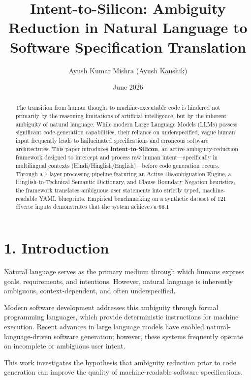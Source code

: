 \documentclass[11pt,a4paper]{article}
\title{Intent-to-Silicon: Ambiguity Reduction in Natural Language to Software Specification Translation}
\author{Ayush Kumar Mishra (Ayush Kaushik)}
\date{June 2026}
\begin{document}
\maketitle
\begin{abstract}
The transition from human thought to machine-executable code is hindered not primarily by the reasoning limitations of artificial intelligence, but by the inherent ambiguity of natural language. While modern Large Language Models (LLMs) possess significant code-generation capabilities, their reliance on underspecified, vague human input frequently leads to hallucinated specifications and erroneous software architectures. This paper introduces \textbf{Intent-to-Silicon}, an active ambiguity-reduction framework designed to intercept and process raw human intent—specifically in multilingual contexts (Hindi/Hinglish/English)—before code generation occurs. Through a 7-layer processing pipeline featuring an Active Disambiguation Engine, a Hinglish-to-Technical Semantic Dictionary, and Clause Boundary Negation heuristics, the framework translates ambiguous user statements into strictly typed, machine-readable YAML blueprints. Empirical benchmarking on a synthetic dataset of 121 diverse inputs demonstrates that the system achieves a 66.1%
\end{abstract}





\section{1. Introduction}

Natural language serves as the primary medium through which humans express goals, requirements, and intentions. However, natural language is inherently ambiguous, context-dependent, and often underspecified.

Modern software development addresses this ambiguity through formal programming languages, which provide deterministic instructions for machine execution. Recent advances in large language models have enabled natural-language-driven software generation; however, these systems frequently operate on incomplete or ambiguous user intent.

This work investigates the hypothesis that ambiguity reduction prior to code generation can improve the quality of machine-readable software specifications.
\end{document}
